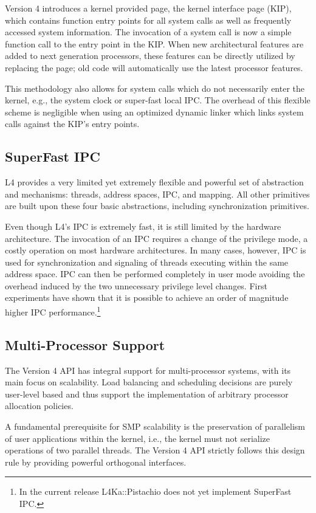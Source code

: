 \documentclass[twoside]{whitepaper}
\newcommand{\Pistachio}{L4Ka::Pistachio\xspace}
\begin{document}
Version 4 introduces a kernel provided page, the kernel interface page
(KIP), which contains function entry points for all system calls as well
as frequently accessed system information.  The invocation of a
system call is now a simple function call to the entry point in the
KIP.  When new architectural features are added to next generation
processors, these features can be directly utilized by replacing the
page; old code will automatically use the latest processor features.

This methodology also allows for system calls which do not necessarily
enter the kernel, e.g., the system clock or super-fast local IPC.  The
overhead of this flexible scheme is negligible when using an optimized
dynamic linker which links system calls against the KIP's entry
points.

\subsection{SuperFast IPC}
L4 provides a very limited yet extremely flexible and powerful
set of abstraction and mechanisms: threads, address spaces, IPC, and
mapping.  All other primitives are built upon these four basic
abstractions, including synchronization primitives.

Even though L4's IPC is extremely fast, it is still limited by the
hardware architecture.  The invocation of an IPC requires a change of
the privilege mode, a costly operation on most hardware architectures.
In many cases, however, IPC is used for synchronization and signaling
of threads executing within the same address space.
IPC can then be performed completely in user mode avoiding the overhead
induced by the two unnecessary privilege level changes.  First experiments
have shown that it is possible to achieve an order of magnitude higher
IPC performance.\footnote{In the current release \Pistachio does not yet implement
SuperFast IPC.}

\subsection{Multi-Processor Support}
The Version 4 API has integral support for multi-processor systems,
with its main focus on scalability.  Load balancing and scheduling
decisions are purely user-level based and thus support the
implementation of arbitrary processor allocation policies.

A fundamental prerequisite for SMP scalability is the preservation
of parallelism of user applications within the kernel, i.e., the kernel
must not serialize operations of two parallel threads.  The Version 4 API
strictly follows this design rule by providing powerful orthogonal
interfaces.
\end{document}
